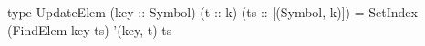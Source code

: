 \begin{code}
type UpdateElem (key :: Symbol) (t :: k) (ts :: [(Symbol, k)]) =
  SetIndex (FindElem key ts) '(key, t) ts
\end{code}
